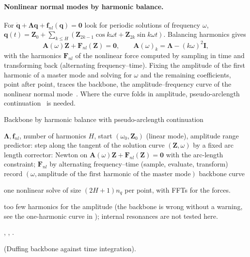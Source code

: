 \paragraph{Nonlinear normal modes by harmonic balance.}
For $\ddot{\bm q}+\bm\Lambda\bm q+\bm f_{nl}(\bm q)=\bm 0$ look for periodic solutions of frequency $\omega$, $\bm q(t)=\bm Z_0+\sum_{k\le H}(\bm Z_{2k-1}\cos k\omega t+\bm Z_{2k}\sin k\omega t)$. Balancing harmonics gives
\begin{equation}\label{eq:ni-hbm}
\bm A(\omega)\bm Z+\bm F_{nl}(\bm Z)=\bm 0,\qquad \bm A(\omega)_k=\bm\Lambda-(k\omega)^2\bm I,
\end{equation}
with the harmonics $\bm F_{nl}$ of the nonlinear force computed by sampling in time and transforming back (alternating frequency--time). Fixing the amplitude of the first harmonic of a master mode and solving for $\omega$ and the remaining coefficients, point after point, traces the backbone, the amplitude--frequency curve of the nonlinear normal mode~\cite{kerschen2009nnm,peeters2009nnm}. Where the curve folds in amplitude, pseudo-arclength continuation~\cite{keller1977} is needed.

\begin{algbox}{Backbone by harmonic balance with pseudo-arclength continuation}
\begin{pseudo}
\Require $\bm\Lambda,\bm f_{nl}$, number of harmonics $H$, start $(\omega_0,\bm Z_0)$ (linear mode), amplitude range
\Repeat
  \State predictor: step along the tangent of the solution curve $(\bm Z,\omega)$ by a fixed arc length
  \State corrector: Newton on $\bm A(\omega)\bm Z+\bm F_{nl}(\bm Z)=\bm0$ with the arc-length constraint; $\bm F_{nl}$ by alternating frequency--time (sample, evaluate, transform)
  \State record $(\omega,\text{amplitude of the first harmonic of the master mode})$
\Ensure backbone curve
\end{pseudo}
\begin{algdet}
\item[Cost] one nonlinear solve of size $(2H+1)n_q$ per point, with FFTs for the forces.
\item[Fails when] too few harmonics for the amplitude (the backbone is wrong without a warning, see the one-harmonic curve in ); internal resonances are not tested here.
\item[Code] , , .
\item[Verified in]  (Duffing backbone against time integration).
\end{algdet}
\end{algbox}

